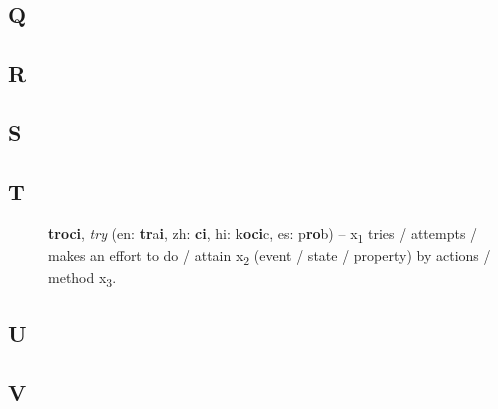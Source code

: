 \documentclass[12pt]{book}
\begin{document}
\subsection{Q} %

\begin{description}
\item[ ]
\end{description}

\subsection{R} %

\begin{description}
\item[ ]
\end{description}

\subsection{S} %

\begin{description}
\item[ ]
\end{description}

\subsection{T} %

\begin{description}
\item[ ] \textbf{troci}, \textit{try} (en: \textbf{tr}a\textbf{i}, zh: \textbf{ci}, hi: k\textbf{oci}c, es: p\textbf{ro}b) -- x\textsubscript{1} tries / attempts / makes an effort to do / attain x\textsubscript{2} (event / state / property) by actions / method x\textsubscript{3}.
\end{description}

\subsection{U} %

\begin{description}
\item[ ]
\end{description}

\subsection{V} %
\end{document}
